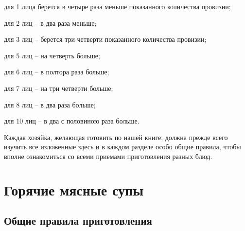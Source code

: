 для 1 лица берется в четыре раза меньше показанного количества провизии;

для 2 лиц – в два раза меньше;

для 3 лиц – берется три четверти показанного количества провизии;

для 5 лиц – на четверть больше;

для 6 лиц – в полтора раза больше;

для 7 лиц – на три четверти больше;

для 8 лиц – в два раза больше;

для 10 лиц – в два с половиною раза больше.

Каждая хозяйка, желающая готовить по нашей книге, должна прежде всего изучить все изложенные здесь и в каждом разделе особо общие правила, чтобы вполне ознакомиться со всеми приемами приготовления разных блюд.

\newpage
\section{Горячие мясные супы}\label{1sec:goriachije-miasnyje-supy}

\subsection*{Общие правила приготовления} \label{1sec:obschie-sup}

